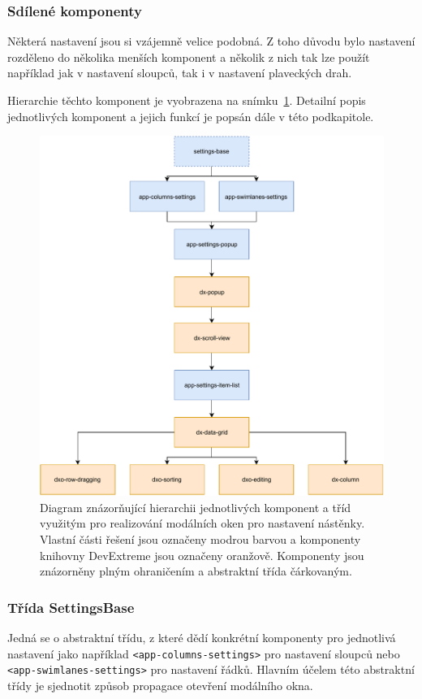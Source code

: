\subsubsection*{Sdílené komponenty}
Některá nastavení jsou si vzájemně velice podobná. Z toho důvodu bylo nastavení rozděleno do několika menších komponent a několik z nich tak lze použít například jak v nastavení sloupců, tak i v nastavení plaveckých drah.

Hierarchie těchto komponent je vyobrazena na snímku~\ref{img:settings-dia}. Detailní popis jednotlivých komponent a jejich funkcí je popsán dále v této podkapitole.

\begin{figure}[H]
	\centering
	\label{img:settings-dia}
	\includegraphics[width=\textwidth]{obrazky-figures/settings-diagram.pdf}
	\caption{Diagram znázorňující hierarchii jednotlivých komponent a tříd využitým pro realizování modálních oken pro nastavení nástěnky. Vlastní části řešení jsou označeny modrou barvou a komponenty knihovny DevExtreme jsou označeny oranžově. Komponenty jsou znázorněny plným ohraničením a abstraktní třída čárkovaným.}
\end{figure}


\subsubsection*{Třída SettingsBase}
Jedná se o abstraktní třídu, z které dědí konkrétní komponenty pro jednotlivá nastavení jako například \texttt{<app-columns-settings>} pro nastavení sloupců nebo  \texttt{<app-swimlanes-settings>} pro nastavení řádků. Hlavním účelem této abstraktní třídy je sjednotit způsob propagace otevření modálního okna.


